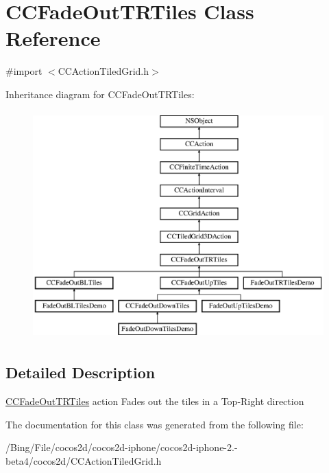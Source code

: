\hypertarget{interface_c_c_fade_out_t_r_tiles}{\section{C\-C\-Fade\-Out\-T\-R\-Tiles Class Reference}
\label{interface_c_c_fade_out_t_r_tiles}
}


{\ttfamily \#import $<$C\-C\-Action\-Tiled\-Grid.\-h$>$}

Inheritance diagram for C\-C\-Fade\-Out\-T\-R\-Tiles\-:\begin{figure}[H]
\begin{center}
\leavevmode
\includegraphics[height=8.805032cm]{interface_c_c_fade_out_t_r_tiles}
\end{center}
\end{figure}


\subsection{Detailed Description}
\hyperlink{interface_c_c_fade_out_t_r_tiles}{C\-C\-Fade\-Out\-T\-R\-Tiles} action Fades out the tiles in a Top-\/\-Right direction 

The documentation for this class was generated from the following file\-:\begin{DoxyCompactItemize}
\item 
/\-Bing/\-File/cocos2d/cocos2d-\/iphone/cocos2d-\/iphone-\/2.-\/beta4/cocos2d/C\-C\-Action\-Tiled\-Grid.\-h\end{DoxyCompactItemize}

